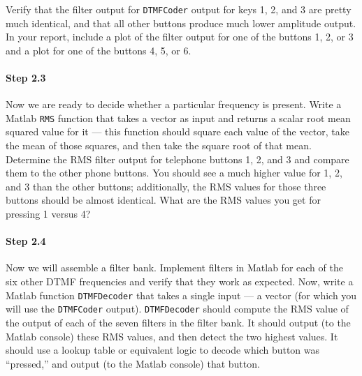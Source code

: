 Verify that the filter output for \verb|DTMFCoder| output for keys 1,
2, and 3 are pretty much identical, and that all other buttons produce
much lower amplitude output.  In your report, include a plot of the
filter output for one of the buttons 1, 2, or 3 and a plot for one of
the buttons 4, 5, or 6.


\paragraph{Step 2.3} Now we are ready to decide whether a particular
frequency is present. Write a Matlab \verb|RMS| function that takes a
vector as input and returns a scalar root mean squared value for it
--- this function should square each value of the vector, take the
mean of those squares, and then take the square root of that
mean. Determine the RMS filter output for telephone buttons 1, 2, and
3 and compare them to the other phone buttons. You should see a much
higher value for 1, 2, and 3 than the other buttons; additionally, the
RMS values for those three buttons should be almost identical. What
are the RMS values you get for pressing 1 versus 4?


\paragraph{Step 2.4} Now we will assemble a filter bank. Implement
filters in Matlab for each of the six other DTMF frequencies and
verify that they work as expected. Now, write a Matlab function
\verb|DTMFDecoder| that takes a single input --- a vector (for which
you will use the \verb|DTMFCoder| output).  \verb|DTMFDecoder| should
compute the RMS value of the output of each of the seven filters in
the filter bank. It should output (to the Matlab console) these RMS
values, and then detect the two highest values. It should use a lookup
table or equivalent logic to decode which button was ``pressed,'' and
output (to the Matlab console) that button.



